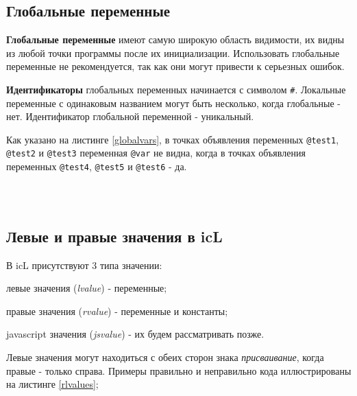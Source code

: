 \subsection{Глобальные переменные}

\textbf{Глобальные переменные} имеют самую широкую область видимости, их видны из любой точки программы после их инициализации. Использовать глобальные переменные не рекомендуется, так как они могут привести к серьезных ошибок.

{\bf Идентификаторы} глобальных переменных начинается с символом {\color{blue2}\texttt{#}}. Локальные переменные с одинаковым названием могут быть несколько, когда глобальные - нет. Идентификатор глобальной переменной - уникальный.

Как указано на листинге \ref{globalvars}, в точках объявления переменных \texttt{@test1}, \texttt{@test2} и \texttt{@test3} переменная \texttt{@var} не видна, когда в точках объявления переменных \texttt{@test4}, \texttt{@test5} и \texttt{@test6} - да.

\

\begin{sourcecode}
	\label{globalvars}
	\inputminted[linenos]{icl}{../sources/globalvars.icL}
\end{sourcecode}

\subsection{Левые и правые значения в icL}

В icL присутствуют 3 типа значении:

\begin{icEnum}
\item
	левые значения ({\it lvalue}) - переменные;
\item
	правые значения ({\it rvalue}) - переменные и константы;
\item
	javascript значения ({\it jsvalue}) - их будем рассматривать позже.
\end{icEnum}

Левые значения могут находиться с обеих сторон знака {\it присваивание}, когда правые - только справа. Примеры правильно и неправильно кода иллюстрированы на листинге \ref{rlvalues};

\begin{sourcecode}
	\label{rlvalues}
	\inputminted[linenos]{icl}{../sources/rlvalues.icL}
\end{sourcecode}


